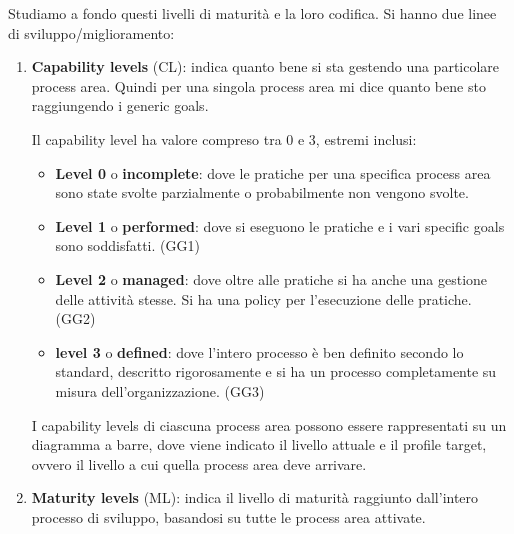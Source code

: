 Studiamo a fondo questi livelli di maturità e la loro codifica. Si hanno due
linee di sviluppo/miglioramento:
\begin{enumerate}
      \item \textbf{Capability levels} (CL): indica quanto bene si sta gestendo
            una particolare process area. Quindi per una singola process area mi
            dice quanto bene sto raggiungendo i generic goals.

            Il capability level ha valore compreso tra 0 e 3, estremi inclusi:
            \begin{itemize}
                  \item \textbf{Level 0} o \textbf{incomplete}: dove le pratiche
                        per una specifica process area sono state svolte
                        parzialmente o probabilmente non vengono svolte.
                  \item \textbf{Level 1} o \textbf{performed}: dove si eseguono
                        le pratiche e i vari specific goals sono soddisfatti. (GG1)
                  \item \textbf{Level 2} o \textbf{managed}: dove oltre alle
                        pratiche si ha anche una gestione delle attività stesse.
                        Si ha una policy per l'esecuzione delle pratiche. (GG2)
                  \item \textbf{level 3} o \textbf{defined}: dove l'intero processo
                        è ben definito secondo lo standard, descritto rigorosamente
                        e si ha un processo completamente su misura dell'organizzazione.
                        (GG3)
            \end{itemize}
            I capability levels di ciascuna process area possono essere rappresentati
            su un diagramma a barre, dove viene indicato il livello attuale e il
            profile target, ovvero il livello a cui quella process area deve arrivare.
      \item \textbf{Maturity levels} (ML): indica il livello di maturità raggiunto
            dall'intero processo di sviluppo, basandosi su tutte le process area
            attivate.


\end{enumerate}

